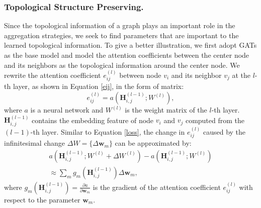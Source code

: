 \documentclass[letterpaper]{article} %
\begin{document}
\subsubsection{Topological Structure Preserving.}
Since the topological information of a graph plays
an important role in the aggregation strategies,
we seek to find parameters that
are important to the learned topological information.
To give a better illustration,
we first adopt GATs as the base model and model
the attention coefficients between the center node and its neighbors as the topological information around the center node.
We rewrite the attention coefficient $e_{ij}^{(l)}$ between node $v_i$ and its neighbor $v_j$ at the $l$-th layer, as shown in Equation \ref{eij}, in the form of matrix:
\begin{equation}
\label{attmat}
  e_{ij}^{(l)} = a(\boldsymbol{H}_{i,j}^{(l-1)}; W^{(l)}),
\end{equation}
\noindent where $a$ is a neural network and $W^{(l)}$ is the weight matrix of the $l$-th layer.
$\boldsymbol{H}_{i,j}^{(l-1)}$ contains the embedding feature of node $v_i$ and $v_j$ computed from the $(l-1)$-th layer.
Similar to Equation \ref{loss}, the change in $e_{ij}^{(l)}$ caused by the infinitesimal change $\Delta W=\{ \Delta \boldsymbol{w}_m \}$
can be approximated by:
\begin{equation}
\begin{split}
\label{attsen}
  a(\boldsymbol{H}_{i,j}^{(l-1)}; W^{(l)} + \Delta W^{(l)})
  -a(\boldsymbol{H}_{i,j}^{(l-1)}; W^{(l)}) \\
  \approx \sum_m g_m (\boldsymbol{H}_{i,j}^{(l-1)}) \Delta \boldsymbol{w}_m,
\end{split}
\end{equation}
\noindent where $g_m (\boldsymbol{H}_{i,j}^{(l-1)})=\frac{\partial a}{\partial{\boldsymbol{w}_m}}$
is the gradient of the attention coefficient $e_{ij}^{(l)}$
with respect to the parameter $\boldsymbol{w}_m$.
\end{document}
